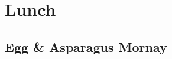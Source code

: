 \newcommand*{\LunchPath}{\RecipesPath/lunch}%

\chapter{Lunch}
  \clearpage  
  \section{Egg & Asparagus Mornay}
  \clearpage
